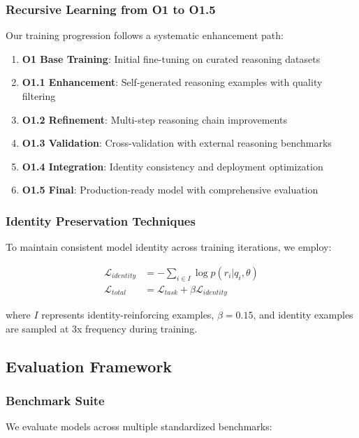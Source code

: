 \subsubsection{Recursive Learning from O1 to O1.5}
Our training progression follows a systematic enhancement path:

\begin{enumerate}
    \item \textbf{O1 Base Training}: Initial fine-tuning on curated reasoning datasets
    \item \textbf{O1.1 Enhancement}: Self-generated reasoning examples with quality filtering
    \item \textbf{O1.2 Refinement}: Multi-step reasoning chain improvements
    \item \textbf{O1.3 Validation}: Cross-validation with external reasoning benchmarks
    \item \textbf{O1.4 Integration}: Identity consistency and deployment optimization
    \item \textbf{O1.5 Final}: Production-ready model with comprehensive evaluation
\end{enumerate}

\subsubsection{Identity Preservation Techniques}
To maintain consistent model identity across training iterations, we employ:

\begin{align}
\mathcal{L}_{identity} &= -\sum_{i \in I} \log p(r_i | q_i, \theta) \\
\mathcal{L}_{total} &= \mathcal{L}_{task} + \beta \mathcal{L}_{identity}
\end{align}

where $I$ represents identity-reinforcing examples, $\beta = 0.15$, and identity examples are sampled at 3x frequency during training.

\subsection{Evaluation Framework}

\subsubsection{Benchmark Suite}
We evaluate models across multiple standardized benchmarks:

